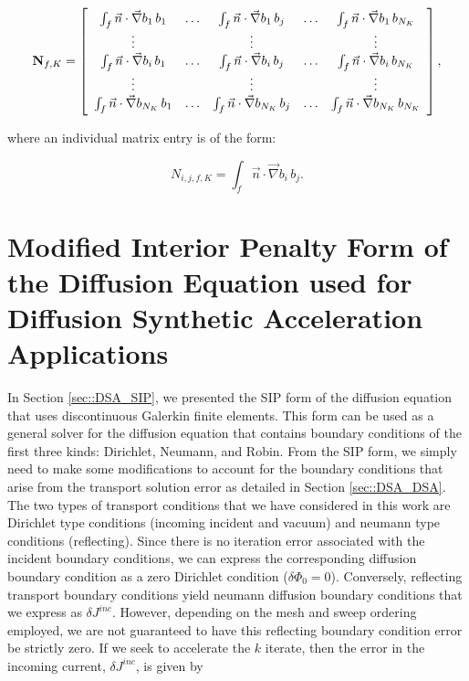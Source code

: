 \begin{equation}
\label{eq::DSA_surface_gradient_matrix_array}
{\bf N}_{f,K} =   \left[
\begin{array} {ccccc}
	\int_f \vec{n} \cdot\vec{\nabla}  b_1 \, b_1  & \ldots & \int_f \vec{n} \cdot \vec{\nabla} b_1 \, b_j  & \ldots & \int_f \vec{n} \cdot \vec{\nabla} b_1 \, b_{N_K} \\
	\vdots  &  & \vdots  &  & \vdots \\
	\int_f \vec{n}\cdot  \vec{\nabla} b_i \, b_1  & \ldots & \int_f \vec{n} \cdot\vec{\nabla}  b_i \, b_j  & \ldots & \int_f \vec{n}\cdot\vec{\nabla}  b_i \, b_{N_K} \\
	\vdots  &  & \vdots  &  & \vdots \\
	\int_f \vec{n} \cdot  \vec{\nabla} b_{N_K} \, b_1  & \ldots & \int_f \vec{n} \cdot  \vec{\nabla} b_{N_K} \, b_j  & \ldots & \int_f \vec{n} \cdot \vec{\nabla}  b_{N_K} \, b_{N_K} \\
\end{array}
\right] ,
\end{equation}

\noindent where an individual matrix entry is of the form:

\begin{equation}
\label{eq::DSA_surface_gradient_matrix_entry}
N_{i,j,f,K} =  \int_f \vec{n} \cdot  \vec{\nabla} b_i \, b_j .
\end{equation}

\section{Modified Interior Penalty Form of the Diffusion Equation used for Diffusion Synthetic Acceleration Applications}
\label{sec::DSA_MIP}

In Section \ref{sec::DSA_SIP}, we presented the SIP form of the diffusion equation that uses discontinuous Galerkin finite elements. This form can be used as a general solver for the diffusion equation that contains boundary conditions of the first three kinds: Dirichlet, Neumann, and Robin. From the SIP form, we simply need to make some modifications to account for the boundary conditions that arise from the transport solution error as detailed in Section \ref{sec::DSA_DSA}. The two types of transport conditions that we have considered in this work are Dirichlet type conditions (incoming incident and vacuum) and neumann type conditions (reflecting). Since there is no iteration error associated with the incident boundary conditions, we can express the corresponding diffusion boundary condition as a zero Dirichlet condition ($\delta \Phi_0 = 0$). Conversely, reflecting transport boundary conditions yield neumann diffusion boundary conditions that we express as $\delta J^{inc}$. However, depending on the mesh and sweep ordering employed, we are not guaranteed to have this reflecting boundary condition error be strictly zero. If we seek to accelerate the $k$ iterate, then the error in the incoming current, $\delta J^{inc}$, is given by

